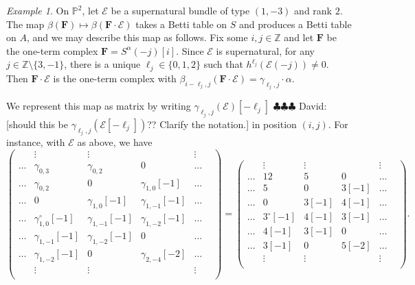 \documentclass[12pt]{amsart}
\theoremstyle{definition}
\theoremstyle{remark}
\newtheorem{example}[lemma]{Example}
\newcommand{\PP}{\mathbb{P}}
\newcommand{\ZZ}{\mathbb{Z}}
\newcommand{\cE}{\mathcal{E}}
\newcommand{\FF}{\mathbf{F}}
\newcommand{\zp}{\circ}
\newcommand{\david}[1]{{\color{red} \sf $\clubsuit\clubsuit\clubsuit$ David: [#1]}}
\begin{document}
\begin{example}\label{ex:sup1}
On $\PP^2$, let $\cE$ be a supernatural bundle of type $(1,-3)$ and rank $2$.  The map $\beta(\FF)\mapsto \beta(\FF\cdot \cE)$ takes a Betti table on $S$ and produces a Betti table on $A$, and we may describe this map as follows.  Fix some $i,j\in \ZZ$ and let $\FF$ be the one-term complex $\FF=S^\alpha(-j)[i]$.  Since $\cE$ is supernatural, for any $j\in \ZZ\setminus \{3,-1\}$, there is a unique $\ell_j\in \{0,1,2\}$ such that $h^{\ell_j}(\cE(-j))\ne 0$.   Then $\FF\cdot \cE$ is the one-term complex with $\beta_{i-\ell_j,j}(\FF\cdot \cE)=\gamma_{\ell_j,j}\cdot \alpha.$

We represent this map as matrix by writing $\gamma_{\ell_j,j}(\cE)[-\ell_j]$
\david{should this be $\gamma_{\ell_j,j}(\cE[-\ell_j])$?? Clarify the notation.}
 in position $(i,j)$.  For instance, with $\cE$ as above, we have
\[
\begin{pmatrix}
&\vdots&\vdots&&\vdots&\\
\dots&\gamma_{0,3}&\gamma_{0,2}&0&\dots\\
\dots&\gamma_{0,2}&0&\gamma_{1,0}[-1]&\dots\\
\dots&0&\gamma_{1,0}[-1]&\gamma_{1,-1}[-1]&\dots\\
\dots&\gamma_{1,0}^\zp[-1]&\gamma_{1,-1}[-1]&\gamma_{1,-2}[-1]&\dots\\
\dots&\gamma_{1,-1}[-1]&\gamma_{1,-2}[-1]&0&\dots\\
\dots&\gamma_{1,-2}[-1]&0&\gamma_{2,-4}[-2]&\dots\\
&\vdots&\vdots&&\vdots&\\
\end{pmatrix}
=
\begin{pmatrix}
&\vdots&\vdots&&\vdots&\\
\dots&12&5&0&\dots\\
\dots&5&0&3[-1]&\dots\\
\dots&0&3[-1]&4[-1]&\dots\\
\dots&3^\zp[-1]&4[-1]&3[-1]&\dots\\
\dots&4[-1]&3[-1]&0&\dots\\
\dots&3[-1]&0&5[-2]&\dots\\
&\vdots&\vdots&&\vdots&\\
\end{pmatrix}.
\]
\end{example}
\end{document}

